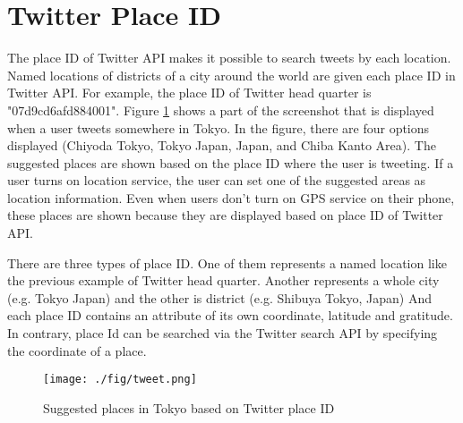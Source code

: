 \begin{comment}
\section{Multi-Class Classification}\label{sec:multi_class_clf} 
\subsection{Support Vector Machine}
one vs. one and one vs. all
equations ??
\subsection{Random Forest}
equations and the explanation
\end{comment}

\section{Twitter Place ID}\label{sec:placeid}
The place ID of Twitter API \cite{twitter_api_placeid} makes it possible to search tweets by each location. 
Named locations of districts of a city around the world are given each place ID in Twitter API.
For example, the place ID of Twitter head quarter is "07d9cd6afd884001".
Figure \ref{fig:tweet} shows a part of the screenshot that is displayed when a user tweets somewhere in Tokyo.
In the figure, there are four options displayed (Chiyoda Tokyo, Tokyo Japan, Japan, and Chiba Kanto Area).
The suggested places are shown based on the place ID where the user is tweeting.
If a user turns on location service, the user can set one of the suggested areas as location information. 
Even when users don't turn on GPS service on their phone, these places are shown because they are displayed based on place ID of Twitter API.

There are three types of place ID.
One of them represents a named location like the previous example of Twitter head quarter.
Another represents a whole city (e.g. Tokyo Japan) and the other is district (e.g. Shibuya Tokyo, Japan)
And each place ID contains an attribute of its own coordinate, latitude and gratitude.
In contrary, place Id can be searched via the Twitter search API by specifying the coordinate of a place.


\begin{figure}
	\centering
	\texttt{[image: ./fig/tweet.png]}
	\caption{Suggested places in Tokyo based on Twitter place ID}
	\label{fig:tweet}
\end{figure}


